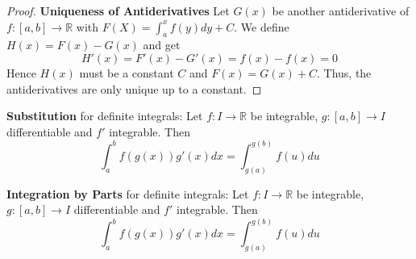 \begin{proof}
    \textbf{Uniqueness of Antiderivatives} Let $G(x)$ be another antiderivative of $f: [a,b] \to \mathbb{R}$ with $F(X) = \int_{a}^{x} f(y)dy + C$. We define $H(x) = F(x) - G(x)$ and get
    $$H'(x) = F'(x) - G'(x) = f(x) - f(x) = 0$$ 
    Hence $H(x)$ must be a constant $C$ and $F(x) = G(x) + C$. Thus, the antiderivatives are only unique up to a constant.
\end{proof}

\begin{lemma}
    \textbf{Substitution} for definite integrals: Let $f: I \to \mathbb{R}$ be integrable, $g: [a,b] \to I$ differentiable and $f'$ integrable. Then
    $$\int_{a}^{b} f(g(x))g'(x)dx  = \int_{g(a)}^{g(b)} f(u) du$$
\end{lemma}

\begin{lemma}
    \textbf{Integration by Parts} for definite integrals: Let $f: I \to \mathbb{R}$ be integrable, $g: [a,b] \to I$ differentiable and $f'$ integrable. Then
    $$\int_{a}^{b} f(g(x))g'(x)dx  = \int_{g(a)}^{g(b)} f(u) du$$
\end{lemma}

